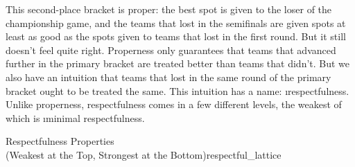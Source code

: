 {    

    This second-place bracket is proper: the best spot is given to the loser of the championship game, and the teams that lost in the semifinals are given spots at least as good as the spots given to teams that lost in the first round. But it still doesn't feel quite right. Properness only guarantees that teams that advanced further in the primary bracket are treated better than teams that didn't. But we also have an intuition that teams that lost in the same round of the primary bracket ought to be treated the same. This intuition has a name: \i{respectfulness}. Unlike properness, respectfulness comes in a few different levels, the weakest of which is \i{minimal respectfulness}.    

    \begin{figg}{Respectfulness Properties\\ (Weakest at the Top, Strongest at the Bottom)}{respectful_lattice}
        \begin{center}
\end{center}
    \end{figg}

}

